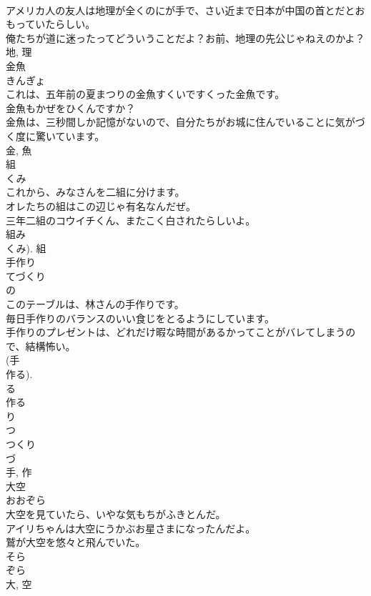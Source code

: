 \documentclass[8pt]{extreport}
\begin{document}
\begin{CJK}{UTF8}{min}
\\	アメリカ人の友人は地理が全くのにが手で、さい近まで日本が中国の首とだとおもっていたらしい。	
\\	俺たちが道に迷ったってどういうことだよ？お前、地理の先公じゃねえのかよ？	
\\	地, 理	
\\	金魚	
\\	きんぎょ	
\\	これは、五年前の夏まつりの金魚すくいですくった金魚です。	
\\	金魚もかぜをひくんですか？	
\\	金魚は、三秒間しか記憶がないので、自分たちがお城に住んでいることに気がづく度に驚いています。	
\\	金, 魚	
\\	組	
\\	くみ	
\\	これから、みなさんを二組に分けます。	
\\	オレたちの組はこの辺じゃ有名なんだぜ。	
\\	三年二組のコウイチくん、またこく白されたらしいよ。	
\\	組み 
\\	くみ).	組	
\\	手作り	
\\	てづくり	
\\	の 
\\	このテーブルは、林さんの手作りです。	
\\	毎日手作りのバランスのいい食じをとるようにしています。	
\\	手作りのプレゼントは、どれだけ暇な時間があるかってことがバレてしまうので、結構怖い。	
\\	(手 
\\	作る). 
\\	る 
\\	作る 
\\	り 
\\	つ 
\\	つくり 
\\	づ 
\\	手, 作	
\\	大空	
\\	おおぞら	
\\	大空を見ていたら、いやな気もちがふきとんだ。	
\\	アイリちゃんは大空にうかぶお星さまになったんだよ。	
\\	鷲が大空を悠々と飛んでいた。	
\\	そら 
\\	ぞら 
\\	大, 空	

\end{CJK}
\end{document}
